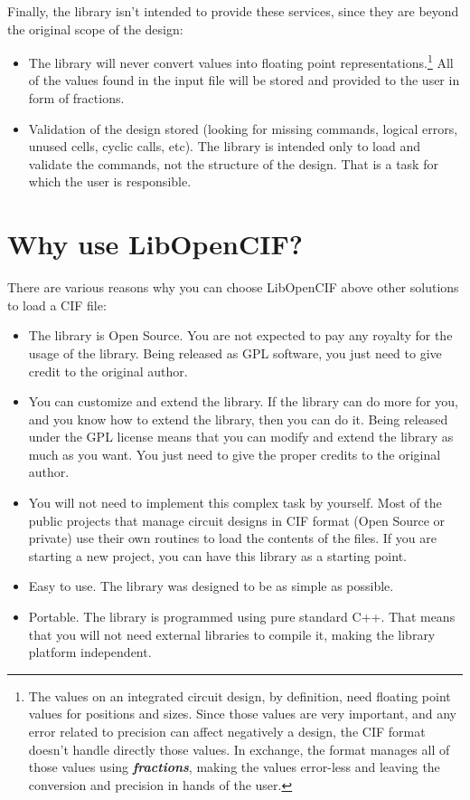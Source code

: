 \documentclass[11pt,twoside,openany,x11names,svgnames]{memoir}
\begin{document}
Finally, the library isn't intended to provide these services, since they are beyond the original scope of the design:

\begin{itemize}
	\item The library will never convert values into floating point representations.\footnote{The values on an integrated circuit design, by definition, need floating point values for positions and sizes. Since those values are very important, and any error related to precision can affect negatively a design, the CIF format doesn't handle directly those values. In exchange, the format manages all of those values using \textbf{\textit{fractions}}, making the values error-less and leaving the conversion and precision in hands of the user.} All of the values found in the input file will be stored and provided to the user in form of fractions.
	\item Validation of the design stored (looking for missing commands, logical errors, unused cells, cyclic calls, etc). The library is intended only to load and validate the commands, not the structure of the design. That is a task for which the user is responsible.
\end{itemize}

\section{Why use LibOpenCIF?}\label{Why-use-LibOpenCIF}

There are various reasons why you can choose LibOpenCIF above other solutions to load a CIF file:

\begin{itemize}
	\item The library is Open Source. You are not expected to pay any royalty for the usage of the library. Being released as GPL software, you just need to give credit to the original author.
	\item You can customize and extend the library. If the library can do more for you, and you know how to extend the library, then you can do it. Being released under the GPL license means that you can modify and extend the library as much as you want. You just need to give the proper credits to the original author.
	\item You will not need to implement this complex task by yourself. Most of the public projects that manage circuit designs in CIF format (Open Source or private) use their own routines to load the contents of the files. If you are starting a new project, you can have this library as a starting point.
	\item Easy to use. The library was designed to be as simple as possible.
	\item Portable. The library is programmed using pure standard C++. That means that you will not need external libraries to compile it, making the library platform independent.
\end{itemize}
\end{document}
